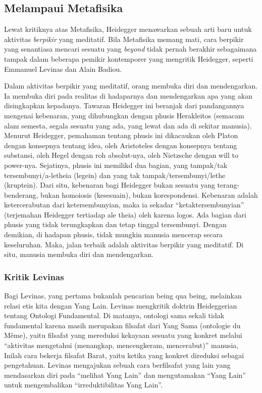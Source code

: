 \documentclass[10pt,a4paper]{article}
\renewenvironment{quote}
{\list{}{%
       \leftmargin 1.5em 
       \rightmargin 0em}
   \item\relax}
{\endlist}
\begin{document}
\begin{multicols}{2}
\hypertarget{melampaui-metafisika}{%
\subsection{Melampaui Metafisika}\label{melampaui-metafisika}}

\begin{quote}
Lewat kritiknya atas Metafisika, Heidegger menawarkan sebuah arti baru
untuk aktivitas \emph{berpikir} yang meditatif. Bila Metafisika memang
mati, cara berpikir yang senantiasa mencari sesuatu yang \emph{beyond}
tidak pernah berakhir sebagaimana tampak dalam beberapa pemikir
kontemporer yang mengritik Heidegger, seperti Emmanuel Levinas dan Alain
Badiou.
\end{quote}

Dalam aktivitas berpikir yang meditatif, orang membuka diri dan
mendengarkan. Ia membuka diri pada realitas di hadaparnya dan
mendengarkan apa yang akan disingkapkan kepadanya. Tawaran Heidegger ini
beranjak dari pandangannya mengenai kebenaran, yang dihubungkan dengan
phusis Herakleitos (semacam alanı semesta, segala sesuatu yang ada, yang
lewat dan ada di sekitar manusia). Menurut Heidegger, pemahaman tentang
phusis ini dikacaukan oleh Platon dengan konsepnya tentang idea, oleh
Aristoteles dengan konsepnya tentang substansi, oleh Hegel dengan roh
absolut-nya, oleh Nietzsche dengan will to power-nya. Sejatinya, phusis
ini memilikd dua bagian, yang tampak/tak tersembunyi/a-letheia (legein)
dan yang tak tampak/tersembunyi/lethe (kruptein). Dari situ, kebenaran
bagi Heidegger bukan sesuatu yang terang-benderang, bukan homoiosis
(kesesuain), bukan korespondensi. Kebenaran adalah ketercerabutan dari
ketersembunyian, maka ia sekadar ``ketaktersembunyian'' (terjemahan
Heidegger tertiadap ale theia) oleh karena logos. Ada bagian dari phusis
yang tidak terungkapkan dan tetap tinggal tersembunyi. Dengan demikian,
di hadapan phusis, tidak mungkin manusia mencerap secara keseluruhan.
Maka, jalan terbaik adalah aktivitas berpikir yang meditatif. Di situ,
manusia membuka diri dan mendengarkan.

\hypertarget{kritik-levinas}{%
\subsubsection{Kritik Levinas}\label{kritik-levinas}}

Bagi Levinas, yang pertama bukanlah pencarian being qua being, melainkan
relasi etis kita dengan Yang Lain. Levinas mengkritik doktrin
Heideggerian tentang Ontologi Fundamental. Di matanya, ontologi sama
sekali tidak fundamental karena masih merupakan filsafat dari Yang Sama
(ontologie du Même), yaitu filsafat yang mereduksi kekayaan sesuatu yang
konkret melalui ``aktivitas mengetahui (menangkap, mencengkeram,
mencerabut)'' manusia, Inilah cara bekerja filsafat Barat, yaitu ketika
yang konkret direduksi sebagai pengetahuan. Levinas mengajukan sebuah
cara berfilsafat yang lain yang mendasarkan diri pada ``melihat Yang
Lain'' dan mengutamakan ``Yang Lain'' untuk mengembalikan
``irreduktibilitas Yang Lain''.


\end{multicols}
\end{document}
